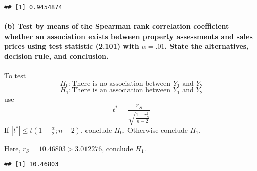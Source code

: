 \documentclass[]{article}
\newenvironment{Shaded}{\begin{snugshade}}{\end{snugshade}}
\newcommand{\KeywordTok}[1]{\textcolor[rgb]{0.13,0.29,0.53}{\textbf{#1}}}
\newcommand{\DataTypeTok}[1]{\textcolor[rgb]{0.13,0.29,0.53}{#1}}
\newcommand{\DecValTok}[1]{\textcolor[rgb]{0.00,0.00,0.81}{#1}}
\newcommand{\StringTok}[1]{\textcolor[rgb]{0.31,0.60,0.02}{#1}}
\newcommand{\OperatorTok}[1]{\textcolor[rgb]{0.81,0.36,0.00}{\textbf{#1}}}
\newcommand{\NormalTok}[1]{#1}
\let\oldparagraph\paragraph
\renewcommand{\paragraph}[1]{\oldparagraph{#1}\mbox{}}
\begin{document}
\begin{verbatim}
## [1] 0.9454874
\end{verbatim}

\paragraph{\texorpdfstring{(b) Test by means of the Spearman rank
correlation coefficient whether an association exists between property
assessments and sales prices using test statistic (2.101) with
\(\alpha =.01\). State the alternatives, decision rule, and
conclusion.}{(b) Test by means of the Spearman rank correlation coefficient whether an association exists between property assessments and sales prices using test statistic (2.101) with \textbackslash{}alpha =.01. State the alternatives, decision rule, and conclusion.}}\label{b-test-by-means-of-the-spearman-rank-correlation-coefficient-whether-an-association-exists-between-property-assessments-and-sales-prices-using-test-statistic-2.101-with-alpha-.01.-state-the-alternatives-decision-rule-and-conclusion.}

To test \[H_0:\text{There is no association between $Y_1$ and $Y_2$}\]
\[H_1:\text{There is an association between $Y_1$ and $Y_2$}\] use
\[t^*=\dfrac{r_S}{\sqrt{\frac{1-r_S^2}{n-2}}}\] If
\(|t^*|\leqslant t(1-\frac{\alpha}{2};n-2)\), conclude \(H_0\).
Otherwise conclude \(H_1\).

Here, \(r_S=10.46803>3.012276\), conclude \(H_1\).

\begin{Shaded}
\end{Shaded}

\begin{verbatim}
## [1] 10.46803
\end{verbatim}

\begin{Shaded}
\end{Shaded}
\end{document}
